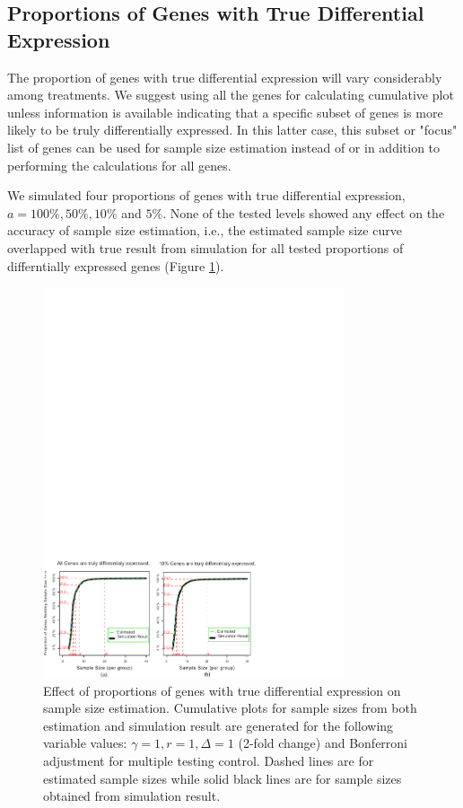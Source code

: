 \documentclass{bioinfo}
\begin{document}
\subsection{Proportions of Genes with True Differential Expression}

The proportion of genes with true differential expression will vary
considerably among treatments. We suggest using all the genes for
calculating cumulative plot unless information is available
indicating that a specific subset of genes is more likely to be
truly differentially expressed. In this latter case, this subset or
"focus" list of genes can be used for sample size estimation instead
of or in addition to performing the calculations for all genes.

We simulated four proportions of genes with true differential
expression, $a = 100\%, 50\%, 10\%$ and $5\%$. None of the tested
levels showed any effect on the accuracy of sample size estimation,
i.e., the estimated sample size curve overlapped with true result
from simulation for all tested proportions of differntially
expressed genes (Figure \ref{fig:ResAlt}).

\begin{figure}[h]
  \centerline{\includegraphics*[width=3.5in]{ResAlt.pdf}}
  \caption[Effect of proportions of genes with true differential expression on sample size estimation]
  {Effect of proportions of genes with true differential expression on sample size estimation.
    Cumulative plots for sample sizes from both estimation and simulation result
    are generated for the following variable values: $\gamma = 1, r = 1, \Delta = 1$ (2-fold
    change) and Bonferroni adjustment for multiple testing control. Dashed lines are for estimated sample sizes
    while solid black lines are for sample sizes obtained from simulation result.}
  \label{fig:ResAlt}
\end{figure}
\end{document}
